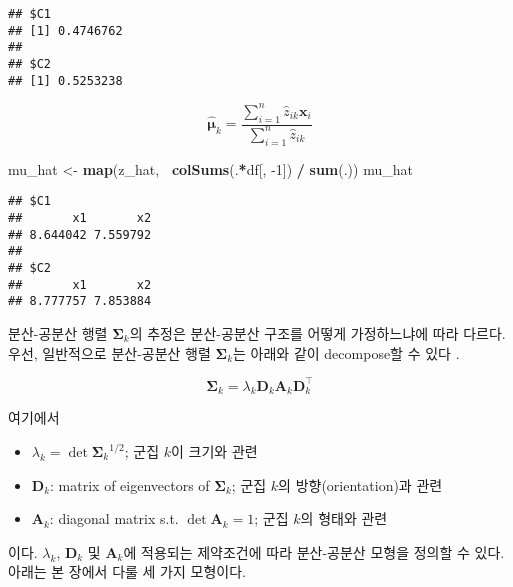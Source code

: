\documentclass[]{book}
\newenvironment{Shaded}{\begin{snugshade}}{\end{snugshade}}
\newcommand{\DecValTok}[1]{\textcolor[rgb]{0.00,0.00,0.81}{#1}}
\newcommand{\KeywordTok}[1]{\textcolor[rgb]{0.13,0.29,0.53}{\textbf{#1}}}
\newcommand{\NormalTok}[1]{#1}
\newcommand{\OperatorTok}[1]{\textcolor[rgb]{0.81,0.36,0.00}{\textbf{#1}}}
\newcommand{\StringTok}[1]{\textcolor[rgb]{0.31,0.60,0.02}{#1}}
\providecommand{\tightlist}{%
  \setlength{\itemsep}{0pt}\setlength{\parskip}{0pt}}
\begin{document}
\begin{verbatim}
## $C1
## [1] 0.4746762
## 
## $C2
## [1] 0.5253238
\end{verbatim}

\begin{equation*}
\hat{\boldsymbol\mu}_k = \frac{\sum_{i = 1}^{n} \hat{z}_{ik} \mathbf{x}_i}{\sum_{i = 1}^{n} \hat{z}_{ik}}
\end{equation*}

\begin{Shaded}
\begin{Highlighting}[]
\NormalTok{mu_hat <-}\StringTok{ }\KeywordTok{map}\NormalTok{(z_hat, }\OperatorTok{~}\KeywordTok{colSums}\NormalTok{(.}\OperatorTok{*}\NormalTok{df[, }\DecValTok{-1}\NormalTok{]) }\OperatorTok{/}\StringTok{ }\KeywordTok{sum}\NormalTok{(.))}
\NormalTok{mu_hat}
\end{Highlighting}
\end{Shaded}

\begin{verbatim}
## $C1
##       x1       x2 
## 8.644042 7.559792 
## 
## $C2
##       x1       x2 
## 8.777757 7.853884
\end{verbatim}

분산-공분산 행렬 \(\boldsymbol\Sigma_k\)의 추정은 분산-공분산 구조를 어떻게 가정하느냐에 따라 다르다. 우선, 일반적으로 분산-공분산 행렬 \(\boldsymbol\Sigma_k\)는 아래와 같이 decompose할 수 있다 \citep{banfield1993model}.

\begin{equation*}
\boldsymbol\Sigma_k = \lambda_k \mathbf{D}_k \mathbf{A}_k \mathbf{D}_k^\top
\end{equation*}

여기에서

\begin{itemize}
\tightlist
\item
  \(\lambda_k = \det{\boldsymbol\Sigma_k}^{1 / 2}\); 군집 \(k\)이 크기와 관련
\item
  \(\mathbf{D}_k\): matrix of eigenvectors of \(\boldsymbol\Sigma_k\); 군집 \(k\)의 방향(orientation)과 관련
\item
  \(\mathbf{A}_k\): diagonal matrix s.t. \(\det{\mathbf{A}_k} = 1\); 군집 \(k\)의 형태와 관련
\end{itemize}

이다. \(\lambda_k\), \(\mathbf{D}_k\) 및 \(\mathbf{A}_k\)에 적용되는 제약조건에 따라 분산-공분산 모형을 정의할 수 있다. 아래는 본 장에서 다룰 세 가지 모형이다.
\end{document}
